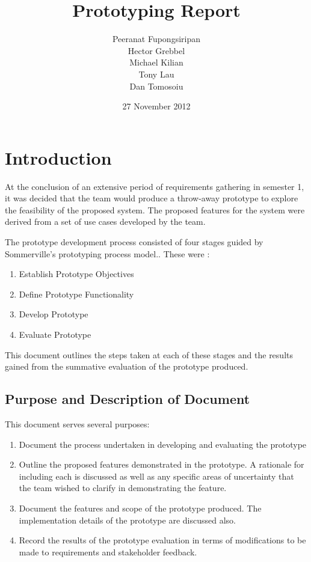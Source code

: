 \documentclass{l3deliverable}
\title{Prototyping Report}
\author{Peeranat Fupongsiripan\\
	Hector Grebbel \\
        Michael Kilian\\
        Tony Lau \\
	Dan Tomosoiu
}
\date{27 November 2012}
\begin{document}

\maketitle

\tableofcontents

\newpage


\section{Introduction}
At the conclusion of an extensive period of requirements gathering in semester 1, it was decided that the team would produce a throw-away prototype to explore the
feasibility of the proposed system. The proposed features for the system were derived from a set of use cases developed by the team. 

The prototype development process consisted of four stages guided by Sommerville's prototyping process model.\cite[Page 45, Figure 2.9]{Sommerville}. These were :
\begin{enumerate}
\item{Establish Prototype Objectives}
\item{Define Prototype Functionality}
\item{Develop Prototype}
\item{Evaluate Prototype}
\end{enumerate}
This document outlines the steps taken at each of these stages and the results gained from the summative evaluation of the prototype produced.

\subsection{Purpose and Description of Document}
This document serves several purposes:
\begin{enumerate}
\item{Document the process undertaken in developing and evaluating the prototype}
\item{Outline the proposed features demonstrated in the prototype. A rationale for including each is discussed as well as any specific areas of uncertainty that the team 
wished to clarify in demonstrating the feature.}
\item{Document the features and scope of the prototype produced. The implementation details of the prototype are discussed also.}
\item{Record the results of the prototype evaluation in terms of modifications to be made to requirements and stakeholder feedback.}
\end{enumerate}
\end{document}
